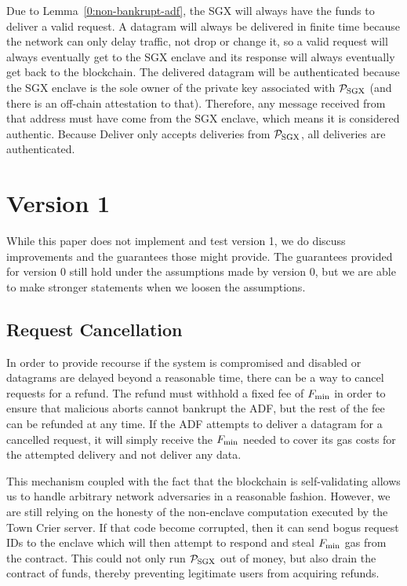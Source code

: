 Due to Lemma~\ref{0:non-bankrupt-adf}, the SGX will always have the funds to deliver a valid request.
A datagram will always be delivered in finite time because the network can only delay traffic, not drop or change it,
so a valid request will always eventually get to the SGX enclave and its response will always eventually get back to the blockchain.
The delivered datagram will be authenticated because the SGX enclave is the sole owner of the private key associated with $\mathcal{P}_{\rm SGX}$ (and there is an off-chain attestation to that).
Therefore, any message received from that address must have come from the SGX enclave, which means it is considered authentic.
Because Deliver only accepts deliveries from $\mathcal{P}_{\rm SGX}$, all deliveries are authenticated.




\section{Version 1}


While this paper does not implement and test version 1, we do discuss improvements and the guarantees those might provide.
The guarantees provided for version 0 still hold under the assumptions made by version 0, but we are able to make stronger statements when we loosen the assumptions.


\subsection{Request Cancellation}

In order to provide recourse if the system is compromised and disabled or datagrams are delayed beyond a reasonable time,
there can be a way to cancel requests for a refund.
The refund must withhold a fixed fee of $F_{\rm min}$ in order to ensure that malicious aborts cannot bankrupt the ADF, but the rest of the fee can be refunded at any time.
If the ADF attempts to deliver a datagram for a cancelled request, it will simply receive the $F_{\rm min}$ needed to cover its gas costs for the attempted delivery and not deliver any data.

This mechanism coupled with the fact that the blockchain is self-validating allows us to handle arbitrary network adversaries in a reasonable fashion.
However, we are still relying on the honesty of the non-enclave computation executed by the Town Crier server.
If that code become corrupted, then it can send bogus request IDs to the enclave which will then attempt to respond and steal $F_{\rm min}$ gas from the contract.
This could not only run $\mathcal{P}_{\rm SGX}$ out of money, but also drain the contract of funds, thereby preventing legitimate users from acquiring refunds.


